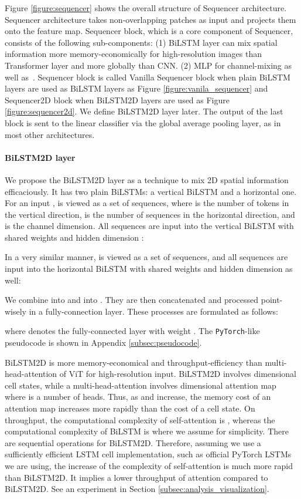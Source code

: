 \documentclass{article}
\begin{document}
Figure \ref{figure:sequencer} shows the overall structure of Sequencer architecture. Sequencer architecture takes non-overlapping patches as input and projects them onto the feature map. Sequencer block, which is a core component of Sequencer, consists of the following sub-components:
(1) BiLSTM layer can mix spatial information more memory-economically for high-resolution images than Transformer layer and more globally than CNN.
(2) MLP for channel-mixing as well as~\cite{dosovitskiy2020image, tolstikhin2021mlp}.
Sequencer block is called Vanilla Sequencer block when plain BiLSTM layers are used as BiLSTM layers as Figure \ref{figure:vanila_sequencer} and Sequencer2D block when BiLSTM2D layers are used as Figure \ref{figure:sequencer2d}. We define BiLSTM2D layer later. The output of the last block is sent to the linear classifier via the global average pooling layer, as in most other architectures.

\paragraph{BiLSTM2D layer}
We propose the BiLSTM2D layer as a technique to mix 2D spatial information efficaciously. It has two plain BiLSTMs: a vertical BiLSTM and a horizontal one. For an input ,  is viewed as a set of sequences, where  is the number of tokens in the vertical direction,  is the number of sequences in the horizontal direction, and  is the channel dimension. All sequences  are input into the vertical BiLSTM with shared weights and hidden dimension :

In a very similar manner,  is viewed as a set of sequences, and all sequences  are input into the horizontal BiLSTM with shared weights and hidden dimension  as well:

We combine  into  and  into .
They are then concatenated and processed point-wisely in a fully-connection layer. These processes are formulated as follows:

where  denotes the fully-connected layer with weight . The \texttt{PyTorch}-like pseudocode is shown in Appendix \ref{subsec:pseudocode}.

BiLSTM2D is more memory-economical and throughput-efficiency than multi-head-attention of ViT for high-resolution input. BiLSTM2D involves  dimensional cell states, while a multi-head-attention involves  dimensional attention map where  is a number of heads. Thus, as  and  increase, the memory cost of an attention map increases more rapidly than the cost of a cell state. On throughput, the computational complexity of self-attention is , whereas the computational complexity of BiLSTM is  where we assume  for simplicity. There are  sequential operations for BiLSTM2D. Therefore, assuming we use a sufficiently efficient LSTM cell implementation, such as official PyTorch LSTMs we are using, the increase of the complexity of self-attention is much more rapid than BiLSTM2D. It implies a lower throughput of attention compared to BiLSTM2D. See an experiment in Section \ref{subsec:analysis_visualization}.
\end{document}
